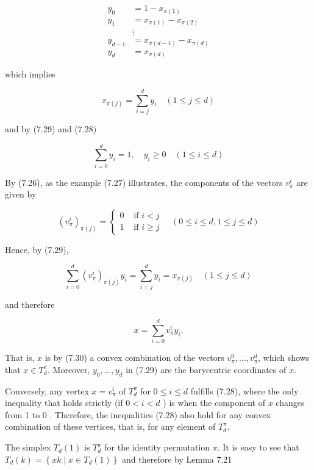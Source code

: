 \documentclass[12pt]{article}
\begin{document}
\begin{align*}
y_{0} & =1-x_{\pi(1)} \\
y_{1} & =x_{\pi(1)}-x_{\pi(2)} \\
& \vdots  \tag{7.29}\\
y_{d-1} & =x_{\pi(d-1)}-x_{\pi(d)} \\
y_{d} & =x_{\pi(d)}
\end{align*}


which implies

$$
x_{\pi(j)}=\sum_{i=j}^{d} y_{i} \quad(1 \leq j \leq d)
$$

and by (7.29) and (7.28)


\begin{equation*}
\sum_{i=0}^{d} y_{i}=1, \quad y_{i} \geq 0 \quad(1 \leq i \leq d) \tag{7.30}
\end{equation*}


By (7.26), as the example (7.27) illustrates, the components of the vectors $v_{\pi}^{i}$ are given by

$$
\left(v_{\pi}^{i}\right)_{\pi(j)}=\left\{\begin{array}{ll}
0 & \text { if } i<j \\
1 & \text { if } i \geq j
\end{array} \quad(0 \leq i \leq d, 1 \leq j \leq d)\right.
$$

Hence, by (7.29),

$$
\sum_{i=0}^{d}\left(v_{\pi}^{i}\right)_{\pi(j)} y_{i}=\sum_{i=j}^{d} y_{i}=x_{\pi(j)} \quad(1 \leq j \leq d)
$$

and therefore


\begin{equation*}
x=\sum_{i=0}^{d} v_{\pi}^{i} y_{i} . \tag{7.31}
\end{equation*}


That is, $x$ is by (7.30) a convex combination of the vectors $v_{\pi}^{0}, \ldots, v_{\pi}^{d}$, which shows that $x \in T_{d}^{\pi}$. Moreover, $y_{0}, \ldots, y_{d}$ in (7.29) are the barycentric coordinates of $x$.

Conversely, any vertex $x=v_{\pi}^{i}$ of $T_{d}^{\pi}$ for $0 \leq i \leq d$ fulfills (7.28), where the only inequality that holds strictly (if $0<i<d$ ) is when the component of $x$ changes from 1 to 0 . Therefore, the inequalities (7.28) also hold for any convex combination of these vertices, that is, for any element of $T_{d}^{\pi}$.

The simplex $T_{d}(1)$ is $T_{d}^{\pi}$ for the identity permutation $\pi$. It is easy to see that $T_{d}(k)=\left\{x k \mid x \in T_{d}(1)\right\}$ and therefore by Lemma 7.21
\end{document}
